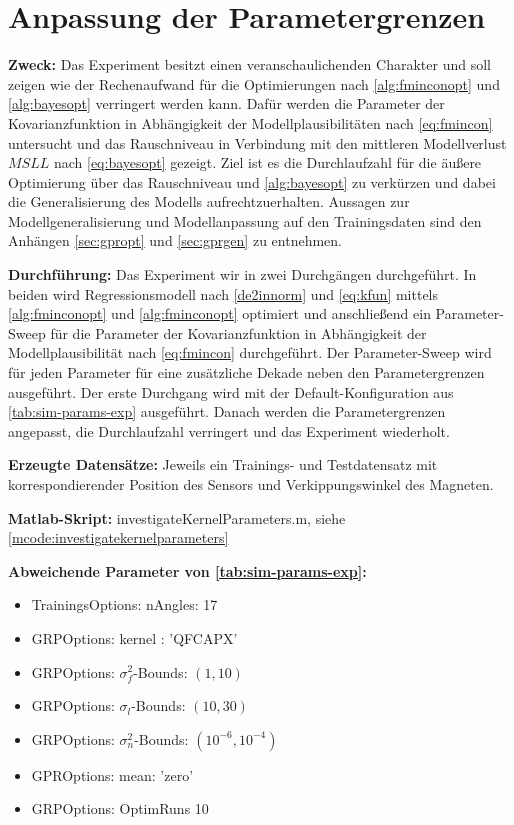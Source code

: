 %

\section{Anpassung der Parametergrenzen}\label{sec:exp4}

\textbf{Zweck:} Das Experiment besitzt einen veranschaulichenden Charakter und soll zeigen wie der Rechenaufwand für die Optimierungen nach \autoref{alg:fminconopt} und \autoref{alg:bayesopt} verringert werden kann. Dafür werden die Parameter der Kovarianzfunktion in Abhängigkeit der Modellplausibilitäten nach \autoref{eq:fmincon} untersucht und das Rauschniveau in Verbindung mit den mittleren Modellverlust $MSLL$ nach \autoref{eq:bayesopt} gezeigt. Ziel ist es die Durchlaufzahl für die äußere Optimierung über das Rauschniveau und \autoref{alg:bayesopt} zu verkürzen und dabei die Generalisierung des Modells aufrechtzuerhalten.
Aussagen zur Modellgeneralisierung und Modellanpassung auf den Trainingsdaten sind den Anhängen \autoref{sec:gpropt} und \autoref{sec:gprgen} zu entnehmen.

\textbf{Durchführung:} Das Experiment wir in zwei Durchgängen durchgeführt. In beiden wird Regressionsmodell nach \autoref{de2innorm} und \autoref{eq:kfun} mittels \autoref{alg:fminconopt} und \autoref{alg:fminconopt} optimiert und anschließend ein Parameter-Sweep für die Parameter der Kovarianzfunktion in Abhängigkeit der Modellplausibilität nach \autoref{eq:fmincon} durchgeführt. Der Parameter-Sweep wird für jeden Parameter für eine zusätzliche Dekade neben den Parametergrenzen ausgeführt. Der erste Durchgang wird mit der Default-Konfiguration aus \autoref{tab:sim-params-exp} ausgeführt. Danach werden die Parametergrenzen angepasst, die Durchlaufzahl verringert und das Experiment wiederholt.

\textbf{Erzeugte Datensätze:} Jeweils ein Trainings- und Testdatensatz mit korrespondierender Position des Sensors und Verkippungswinkel des Magneten.

\textbf{Matlab-Skript:} investigateKernelParameters.m, siehe \autoref{mcode:investigatekernelparameters}

\textbf{Abweichende Parameter von \autoref{tab:sim-params-exp}:}

\begin{itemize}
	\item TrainingsOptions: nAngles: 17
	\item GRPOptions: kernel : 'QFCAPX'
	\item GRPOptions: $\sigma_f^2$-Bounds: $(1,10)$
	\item GRPOptions: $\sigma_l$-Bounds: $(10,30)$
	\item GRPOptions: $\sigma_n^2$-Bounds: $(10^{-6},10^{-4})$
	\item GPROptions: mean: 'zero'
	\item GRPOptions: OptimRuns 10
\end{itemize}


